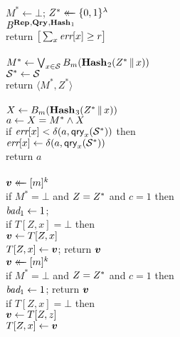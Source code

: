 \begin{figure*}
{
  \vspace{-7pt}
      \hfill {}\\[2pt]
    $M^* \gets \bot$;
    $Z^* \mathrel{\leftarrow\mkern-14mu\leftarrow} \{0,1\}^\lambda$\\
    $\mathit{B}^{\textup{\textbf{Rep}}\hspace{0.5pt},\textup{\textbf{Qry}}\hspace{0.5pt},\textup{\textbf{Hash}}\hspace{0.5pt}_1}$\\
    return $\big[\sum_x \textit{err}[x] \geq r\big]$
  \\[6pt]
  \oraclev{$\REPO(\col)$}\\[2pt]
    $M^* \gets \bigvee_{x \in \mathcal{S}} {B}_m(\textup{\textbf{Hash}}\hspace{0.5pt}_2(Z^* \, \| \, x))$\\
    $\mathcal{S}^* \gets \mathcal{S}$\\
    return $\langle M^*, Z^* \rangle$
  \\[6pt]
  \\[2pt]
    $X \gets {B}_m(\textup{\textbf{Hash}}\hspace{0.5pt}_3(Z^* \, \| \, x))$\\
    $a \gets X = M^* \wedge X$\\
    if $\textit{err}[x] < \delta(a,\mathsf{qry}_x(\mathcal{S}^*))$ then\\
          $\textit{err}[x] \gets \delta(a,\mathsf{qry}_x(\mathcal{S}^*))$\\
    return $a$
  \\[6pt]
  \\[2pt]
    $\v.v \getsr [m]^k$\\
    if $M^*=\bot$ and $Z=Z^*$ and $c=1$ then\\
    \tab $\textit{bad}_1 \gets 1$;  \\
    if $T[Z,x] = \bot$ then\\
    \tab $\v.v \gets T[Z,x]$\\
    $T[Z,x] \gets \v.v$; return $\v.v$
}
{
  \vspace{-2pt}
  \\[2pt]
    $\v.v \getsr [m]^k$\\
    if $M^*=\bot$ and $Z=Z^*$ and $c=1$ then\\
    \tab $\textit{bad}_1 \gets 1$; return $\v.v$\\
    if $T[Z,x] = \bot$ then\\
    \tab $\v.v \gets T[Z,z]$\\
    $T[Z,x] \gets \v.v$\\[2pt]
    }
\end{figure*}
